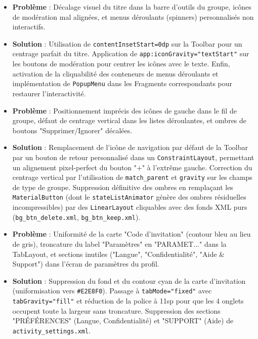 \documentclass{article}
\begin{document}
\begin{itemize}
    \item \textbf{Problème} : Décalage visuel du titre dans la barre d'outils du groupe, icônes de modération mal alignées, et menus déroulants (spinners) personnalisés non interactifs.
    \item \textbf{Solution} : Utilisation de \texttt{contentInsetStart=0dp} sur la Toolbar pour un centrage parfait du titre. Application de \texttt{app:iconGravity="textStart"} sur les boutons de modération pour centrer les icônes avec le texte. Enfin, activation de la cliquabilité des conteneurs de menus déroulants et implémentation de \texttt{PopupMenu} dans les Fragments correspondants pour restaurer l'interactivité.
    \item \textbf{Problème} : Positionnement imprécis des icônes de gauche dans le fil de groupe, défaut de centrage vertical dans les listes déroulantes, et ombres de boutons "Supprimer/Ignorer" décalées.
    \item \textbf{Solution} : Remplacement de l'icône de navigation par défaut de la Toolbar par un bouton de retour personnalisé dans un \texttt{ConstraintLayout}, permettant un alignement pixel-perfect du bouton "+" à l'extrême gauche. Correction du centrage vertical par l'utilisation de \texttt{match\_parent} et \texttt{gravity} sur les champs de type de groupe. Suppression définitive des ombres en remplaçant les \texttt{MaterialButton} (dont le \texttt{stateListAnimator} génère des ombres résiduelles incompressibles) par des \texttt{LinearLayout} cliquables avec des fonds XML purs (\texttt{bg\_btn\_delete.xml}, \texttt{bg\_btn\_keep.xml}).
    \item \textbf{Problème} : Uniformité de la carte "Code d'invitation" (contour bleu au lieu de gris), troncature du label "Paramètres" en "PARAMET..." dans la TabLayout, et sections inutiles ("Langue", "Confidentialité", "Aide \& Support") dans l'écran de paramètres du profil.
    \item \textbf{Solution} : Suppression du fond et du contour cyan de la carte d'invitation (uniformisation vers \texttt{\#E2E8F0}). Passage à \texttt{tabMode="fixed"} avec \texttt{tabGravity="fill"} et réduction de la police à 11sp pour que les 4 onglets occupent toute la largeur sans troncature. Suppression des sections "PRÉFÉRENCES" (Langue, Confidentialité) et "SUPPORT" (Aide) de \texttt{activity\_settings.xml}.
\end{itemize}
\end{document}
